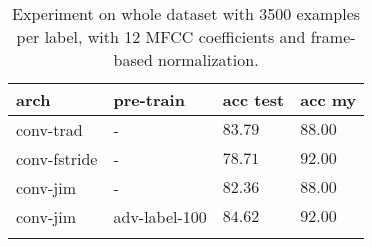 \begin{table}[ht!]
\begin{center}
\caption{Experiment on whole dataset with 3500 examples per label, with 12 MFCC coefficients and frame-based normalization.}
\begin{tabular}{ M{3cm}  M{2cm}  M{2.5cm}  M{2.5cm} }
\toprule
\textbf{arch} & \textbf{pre-train} & \textbf{acc test} & \textbf{acc my} \\
\midrule
conv-trad & - & $83.79 $ & $88.00 $ \\
conv-fstride & - & $78.71 $ & $92.00 $ \\
conv-jim & - & $82.36 $ & $88.00 $ \\
\midrule
conv-jim & adv-label-100 & $84.62 $ & $92.00 $ \\
\bottomrule
\label{tab:exp_final_l12}
\end{tabular}
\end{center}
\vspace{-4mm}
\end{table}
\FloatBarrier
\noindent